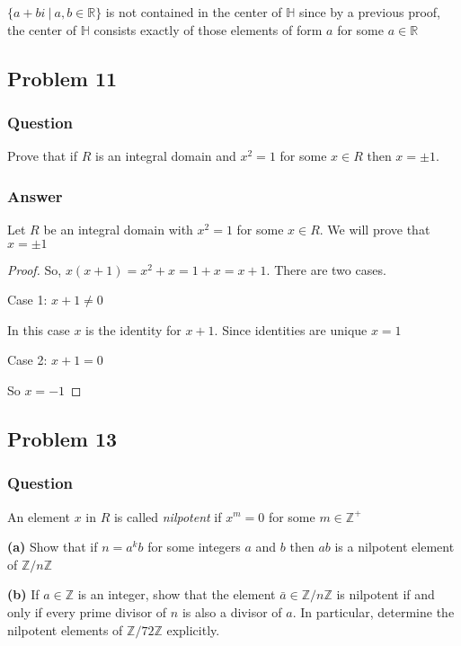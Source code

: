 \documentclass[12pt]{article}
\begin{document}
$\{a+bi\ |\ a,b\in\mathbb{R} \}$ is not contained in the center of $\mathbb{H}$ since by a previous proof, the center of $\mathbb{H}$ consists exactly of those elements of form $a$ for some $a \in \mathbb{R}$


\subsection{Problem 11}

\subsubsection{Question}
Prove that if $R$ is an integral domain and $x^2=1$ for some $x\in R$ then $x=\pm 1$.
\subsubsection{Answer}
Let $R$ be an integral domain with  $x^2=1$ for some $x\in R$. We will prove that $x=\pm 1$

\begin{proof}
So, $x(x+1)=x^2+x = 1+x = x +1$. There are two cases. 

Case 1: $x+1\neq0$

In this case $x$ is the identity for $x+1$. Since identities are unique $x=1$

Case 2: $x+1=0$

So $x = -1$\end{proof}



\subsection{Problem 13}

\subsubsection{Question}
An element $x$ in $R$ is called \emph{nilpotent} if $x^m=0$ for some $m \in \mathbb{Z}^{+}$

\textbf{(a)} Show that if $n=a^k b $ for some integers $a$ and $b$ then $ab$ is a nilpotent element of $\mathbb{Z} /n\mathbb{Z}$

\textbf{(b)} If $a \in \mathbb{Z}$ is an integer, show that the element $\bar{a} \in \mathbb{Z} / n \mathbb{Z}$ is nilpotent if and only if every prime divisor of $n$ is also a divisor of $a$. In particular, determine the nilpotent elements of $\mathbb{Z} / 72\mathbb{Z}$ explicitly.
\end{document}
